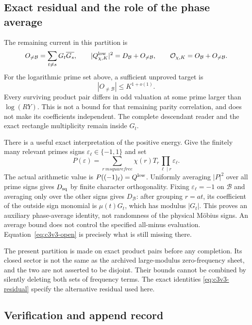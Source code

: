 \documentclass[11pt]{article}
\theoremstyle{remark}
\begin{document}
\subsection{Exact residual and the role of the phase average}

The remaining current in this partition is
\begin{equation}
 O_{\ne\mathcal B}=\sum_{t\ne s}G_t\overline{G_s},\qquad
 |Q^{\rm low}_{\chi,K}|^2=D_{\mathcal B}+O_{\ne\mathcal B},
 \qquad \mathcal O_{\chi,K}=O_{\mathcal B}+O_{\ne\mathcal B}.
 \label{eq:c3v3-residual}
\end{equation}
For the logarithmic prime set above, a sufficient unproved target is
\begin{equation}
 |O_{\ne\mathcal B}|\le K^{1+o(1)}.
 \label{eq:c3v3-open}
\end{equation}
Every surviving product pair differs in odd valuation at some prime
larger than \(\log(RY)\).  This is not a bound for that remaining
parity correlation, and does not make its coefficients independent.
The complete descendant reader and the exact rectangle multiplicity
remain inside \(G_t\).

There is a useful exact interpretation of the positive energy.  Give
the finitely many relevant primes signs \(\varepsilon_\ell\in\{-1,1\}\)
and set
\[
 P(\varepsilon)=\sum_{r\ {
m squarefree}}
                \chi(r)T_r\prod_{\ell\mid r}\varepsilon_\ell.
\]
The actual arithmetic value is \(P((-1)_\ell)=Q^{\rm low}\).
Uniformly averaging \(|P|^2\) over all prime signs gives
\(D_{\rm sq}\) by finite character orthogonality.  Fixing
\(\varepsilon_\ell=-1\) on \(\mathcal B\) and averaging only
over the other signs gives \(D_{\mathcal B}\): after grouping
\(r=at\), its coefficient of the outside sign monomial is
\(\mu(t)G_t\), which has modulus \(|G_t|\).
This proves an auxiliary phase-average identity, not randomness of
the physical M\"obius signs.  An average bound does not control
the specified all-minus evaluation.  Equation~\eqref{eq:c3v3-open}
is precisely what is still missing there.

The present partition is made on exact product pairs before any
completion.  Its closed sector is not the same as the archived
large-modulus zero-frequency sheet, and the two are not asserted
to be disjoint.  Their bounds cannot be combined by silently deleting
both sets of frequency terms.  The exact identities
\eqref{eq:c3v3-residual} specify the alternative residual used here.

\subsection*{Verification and append record}
\end{document}
